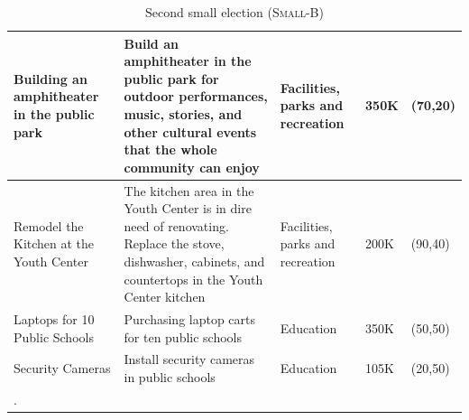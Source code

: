 \documentclass[runningheads]{llncs}
\begin{document}
\begin{longtable}[ht!]{|p{2cm}|p{6cm}|p{3cm}|p{1cm}|p{2.5cm}|}
    \hline
    Building an amphitheater in the public park & Build an amphitheater in the public park for outdoor performances, music, stories, and other cultural events that the whole community can enjoy & Facilities, parks and recreation & 350K & (70,20)\\
    \hline
    Remodel the Kitchen at the Youth Center & The kitchen area in the Youth Center is in dire need of renovating. Replace the stove, dishwasher, cabinets, and countertops in the Youth Center kitchen & Facilities, parks and recreation & 200K & (90,40)\\
    \hline
    Laptops for 10 Public Schools & Purchasing laptop carts for ten public schools & Education & 350K & (50,50)\\
    \hline
    Security Cameras & Install security cameras in public schools & Education & 105K & (20,50)\\
     \hline
  \caption{Second small election (\textsc{Small-B})}\label{tab:second_elc}.
\end{longtable}
\end{document}
